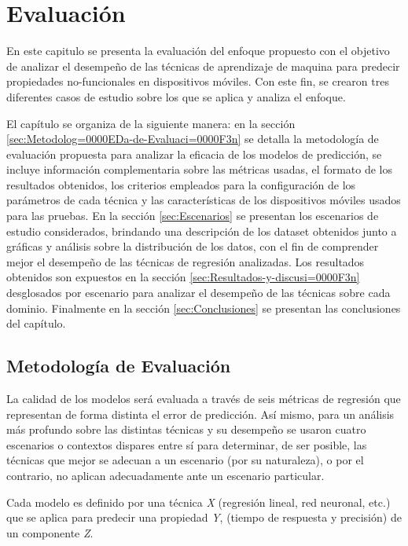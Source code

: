 
\chapter{Evaluación\label{chap:Evaluaci=0000F3n}}

En este capitulo se presenta la evaluación del enfoque propuesto con
el objetivo de analizar el desempeño de las técnicas de aprendizaje
de maquina para predecir propiedades no-funcionales en dispositivos
móviles. Con este fin, se crearon tres diferentes casos de estudio
sobre los que se aplica y analiza el enfoque.

El capítulo se organiza de la siguiente manera: en la sección \ref{sec:Metodolog=0000EDa-de-Evaluaci=0000F3n}
se detalla la metodología de evaluación propuesta para analizar la
eficacia de los modelos de predicción, se incluye información complementaria
sobre las métricas usadas, el formato de los resultados obtenidos,
los criterios empleados para la configuración de los parámetros de
cada técnica y las características de los dispositivos móviles usados
para las pruebas. En la sección \ref{sec:Escenarios} se presentan
los escenarios de estudio considerados, brindando una descripción
de los dataset obtenidos junto a gráficas y análisis sobre la distribución
de los datos, con el fin de comprender mejor el desempeño de las técnicas
de regresión analizadas. Los resultados obtenidos son expuestos en
la sección \ref{sec:Resultados-y-discusi=0000F3n} desglosados por
escenario para analizar el desempeño de las técnicas sobre cada dominio.
Finalmente en la sección \ref{sec:Conclusiones} se presentan las
conclusiones del capítulo. 


\section{Metodología de Evaluación\label{sec:Metodolog=0000EDa-de-Evaluaci=0000F3n}}

La calidad de los modelos será evaluada a través de seis métricas
de regresión que representan de forma distinta el error de predicción.
Así mismo, para un análisis más profundo sobre las distintas técnicas
y su desempeño se usaron cuatro escenarios o contextos dispares entre
sí para determinar, de ser posible, las técnicas que mejor se adecuan
a un escenario (por su naturaleza), o por el contrario, no aplican
adecuadamente ante un escenario particular. 

Cada modelo es definido por una técnica \emph{X} (regresión lineal,
red neuronal, etc.) que se aplica para predecir una propiedad \emph{Y},
(tiempo de respuesta y precisión) de un componente \emph{Z}. 

